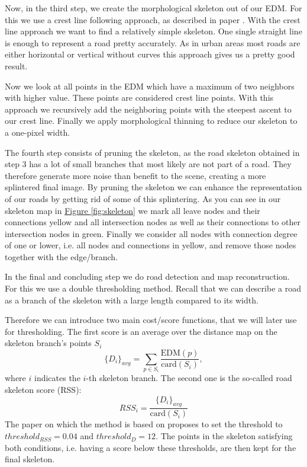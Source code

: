 \documentclass[10pt,conference,compsocconf]{IEEEtran}
\newcommand{\figref}[1]{\hyperref[#1]{Figure \ref*{#1}}}
\begin{document}
Now, in the third step, we create the morphological skeleton out of our EDM. For this we use a crest line following approach, as described in paper \cite{GaZeScPo11}. With the crest line approach we want to find a relatively simple skeleton. One single straight line is enough to represent a road pretty accurately. As in urban areas most roads are either horizontal or vertical without curves this approach gives us a pretty good result. 

Now we look at all points in the EDM which have a maximum of two neighbors with higher value. These points are considered crest line points. With this approach we recursively add the neighboring points with the steepest ascent to our crest line. Finally we apply morphological thinning to reduce our skeleton to a one-pixel width.

The fourth step consists of pruning the skeleton, as the road skeleton obtained in step 3 has a lot of small branches that most likely are not part of a road. They therefore generate more noise than benefit to the scene, creating a more splintered final image. By pruning the skeleton we can enhance the representation of our roads by getting rid of some of this splintering. As you can see in our skeleton map in \figref{fig:skeleton} we mark all leave nodes and their connections yellow and all intersection nodes as well as their connections to other intersection nodes in green. Finally we consider all nodes with connection degree of one or lower, i.e. all nodes and connections in yellow, and remove those nodes together with the edge/branch.

In the final and concluding step we do road detection and map reconstruction. For this we use a double thresholding method. Recall that we can describe a road as a branch of the skeleton with a large length compared to its width. 

Therefore we can introduce two main cost/score functions, that we will later use for thresholding. The first score is an average over the distance map on the skeleton branch's points $S_{i}$
$$
\{D_i\}_{avg} = \sum_{p \in S_{i}}{\frac{\textrm{EDM}(p)}{\textrm{card}(S_{i})}},
$$
where $i$ indicates the $i$-th skeleton branch. The second one is the so-called road skeleton score (RSS):
$$
RSS_{i} = \frac{{\{D_i\}}_{avg}}{\textrm{card}(S_{i})}
$$
The paper on which the method is based on \cite{GaZeScPo11} proposes to set the threshold to $threshold_{RSS} = 0.04$ and $threshold_{D} = 12$. The points in the skeleton satisfying both conditions, i.e. having a score below these thresholds, are then kept for the final skeleton.
\end{document}

